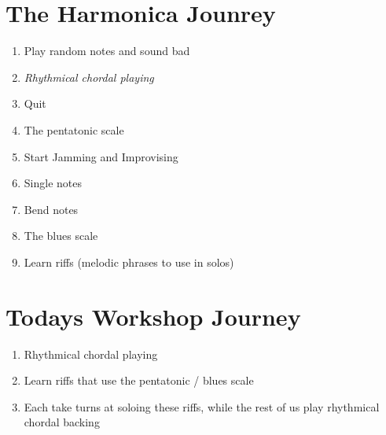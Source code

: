 \section*{The Harmonica Jounrey}
    \begin{enumerate}
        \item Play random notes and sound bad
        \item \textit{Rhythmical chordal playing} 
        \item{\color{red} Quit \color{black}}
        \item The pentatonic scale
        \item Start Jamming and Improvising
        \item Single notes
        \item Bend notes
        \item The blues scale
        \item Learn riffs (melodic phrases to use in solos)
    \end{enumerate}
    
\section*{Todays Workshop Journey}
    \begin{enumerate}
        \item Rhythmical chordal playing 
        \item Learn riffs that use the pentatonic / blues scale
        \item Each take turns at soloing these riffs, while the rest of us play rhythmical chordal backing
    \end{enumerate}
    
    
